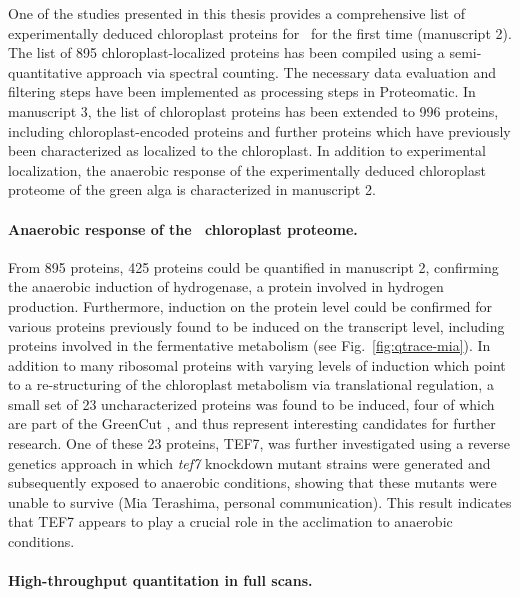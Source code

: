 One of the studies presented in this thesis provides a comprehensive list of 
experimentally deduced chloroplast proteins for \cre~for the first time
(manuscript 2).
The list of 895 chloroplast-localized proteins has been compiled using
a semi-quantitative approach via spectral counting.
The necessary data evaluation and filtering steps have been implemented
as processing steps in Proteomatic.
In manuscript 3, the list of chloroplast proteins has been extended 
to 996 proteins, including chloroplast-encoded proteins and further proteins
which have previously been characterized as localized to the chloroplast.
In addition to experimental localization, the anaerobic response of the 
experimentally deduced chloroplast proteome of the green alga is characterized 
in manuscript 2. 

\paragraph{Anaerobic response of the \cre~chloroplast proteome.}

From 895 proteins, 425 proteins could be quantified in manuscript 2, 
confirming the anaerobic induction of hydrogenase, a protein involved in 
hydrogen production.
Furthermore, induction on the protein level could be confirmed for various 
proteins previously found to be induced on the transcript level,
including proteins involved in the fermentative metabolism 
(see Fig.~\ref{fig:qtrace-mia}).
In addition to many ribosomal proteins with varying levels of induction
which point to a re-structuring of the chloroplast metabolism via translational 
regulation, a small set of 23 uncharacterized proteins was found to be induced,
four of which are part of the GreenCut \citep{Grossman2010}, and thus represent 
interesting candidates for further research.
One of these 23 proteins, TEF7, was further investigated using a reverse 
genetics approach in which {\em tef7} knockdown mutant strains were generated
and subsequently exposed to anaerobic conditions, showing that these mutants 
were unable to survive (Mia Terashima, personal communication).
This result indicates that TEF7 appears to play a crucial role in the 
acclimation to anaerobic conditions.

\paragraph{High-throughput quantitation in full scans.}

